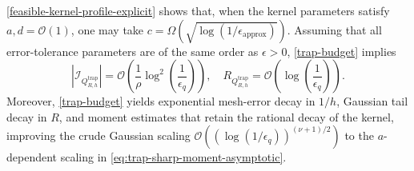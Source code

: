 \documentclass[10pt,reqno]{article}
\numberwithin{equation}{section}
\theoremstyle{plain}
\theoremstyle{definition}
\begin{document}
\cref{feasible-kernel-profile-explicit} shows that, when the kernel parameters satisfy $a,d = \mathcal{O}(1)$, one may take $c = \Omega(\sqrt{\log(1/\epsilon_{\operatorname{approx}})})$. Assuming that all error-tolerance parameters are of the same order as $\epsilon > 0$, \cref{trap-budget} implies
\begin{equation}
|\mathcal I_{Q_{R,h}^{\operatorname{trap}}}| = \mathcal O\left(\frac{1}{\rho}\log^{2}\left(\frac1{\epsilon_q}\right)\right), \quad R_{Q_{R,h}^{\operatorname{trap}}} = \mathcal O\left(\log\left(\frac1{\epsilon_q}\right)\right).
\end{equation}
Moreover, \cref{trap-budget} yields exponential mesh-error decay in $1/h$, Gaussian tail decay in $R$, and moment estimates that retain the rational decay of the kernel, improving the crude Gaussian scaling $\mathcal O((\log(1/\epsilon_q))^{(\nu+1)/2})$ to the $a$-dependent scaling in \cref{eq:trap-sharp-moment-asymptotic}.
\end{document}
